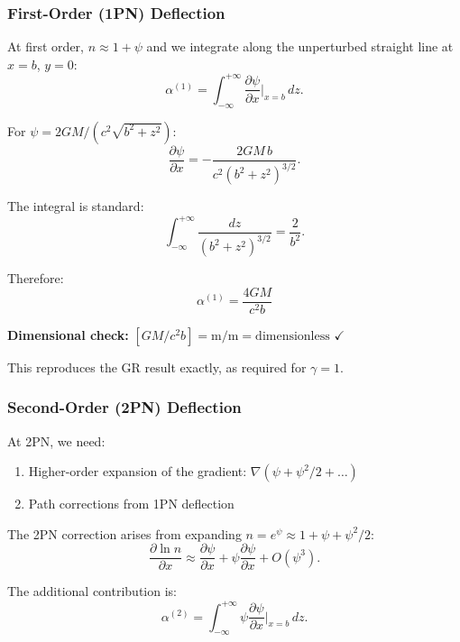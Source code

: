 \subsubsection{First-Order (1PN) Deflection}

At first order, $n \approx 1 + \psi$ and we integrate along the unperturbed 
straight line at $x = b$, $y = 0$:
\begin{equation}
\alpha^{(1)} = \int_{-\infty}^{+\infty} \frac{\partial \psi}{\partial x}\bigg|_{x=b}\,dz.
\end{equation}

For $\psi = 2GM/(c^2\sqrt{b^2 + z^2})$:
\begin{equation}
\frac{\partial \psi}{\partial x} = -\frac{2GM\,b}{c^2(b^2 + z^2)^{3/2}}.
\end{equation}

The integral is standard:
\begin{equation}
\int_{-\infty}^{+\infty} \frac{dz}{(b^2 + z^2)^{3/2}} = \frac{2}{b^2}.
\end{equation}

Therefore:
\begin{equation}
\boxed{\alpha^{(1)} = \frac{4GM}{c^2 b}}
\label{eq:deflection_1pn}
\end{equation}

\textbf{Dimensional check:} $[GM/c^2 b] = \text{m}/\text{m} = \text{dimensionless}$ $\checkmark$

This reproduces the GR result exactly, as required for $\gamma = 1$.

\subsubsection{Second-Order (2PN) Deflection}

At 2PN, we need:
\begin{enumerate}
\item Higher-order expansion of the gradient: $\nabla(\psi + \psi^2/2 + \ldots)$
\item Path corrections from 1PN deflection
\end{enumerate}

The 2PN correction arises from expanding $n = e^\psi \approx 1 + \psi + \psi^2/2$:
\begin{equation}
\frac{\partial \ln n}{\partial x} \approx \frac{\partial \psi}{\partial x} + \psi\frac{\partial \psi}{\partial x} + O(\psi^3).
\end{equation}

The additional contribution is:
\begin{equation}
\alpha^{(2)} = \int_{-\infty}^{+\infty} \psi\frac{\partial \psi}{\partial x}\bigg|_{x=b}\,dz.
\end{equation}

